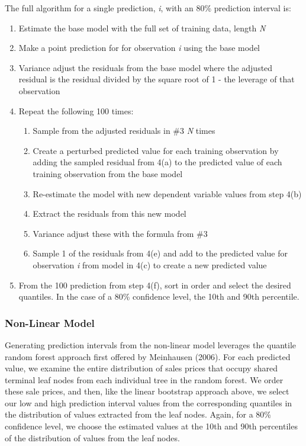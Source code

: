 \documentclass[colTwo]{anon}
\theoremstyle{definition}
\begin{document}
The full algorithm for a single prediction, \textit{i}, with an 80\% prediction interval is:
\begin{enumerate}
\item Estimate the base model with the full set of training data, length \textit{N}
\item Make a point prediction for for observation \textit{i} using the base model
\item Variance adjust the residuals from the base model where the adjusted residual is the residual divided by the square root of 1 - the leverage of that observation
\item Repeat the following 100 times:
\begin{enumerate}
\item Sample from the adjusted residuals in \#3 \textit{N} times
\item Create a perturbed predicted value for each training observation by adding the sampled residual from 4(a) to the predicted value of each training observation from the base model
\item Re-estimate the model with new dependent variable values from step 4(b)
\item Extract the residuals from this new model
\item Variance adjust these with the formula from \#3
\item Sample 1 of the residuals from 4(e) and add to the predicted value for observation \textit{i} from model in 4(c) to create a new predicted value
\end{enumerate}
\item From the 100 prediction from step 4(f), sort in order and select the desired quantiles.  In the case of a 80\% confidence level, the 10th and 90th percentile. 
\end{enumerate}

\subsubsection{Non-Linear Model}

Generating prediction intervals from the non-linear model leverages the quantile random forest approach first offered by Meinhausen (2006).  For each predicted value, we examine the entire distribution of sales prices that occupy shared terminal leaf nodes from each individual tree in the random forest.  We order these sale prices, and then, like the linear bootstrap approach above, we select our low and high prediction interval values from the corresponding quantiles in the distribution of values extracted from the leaf nodes. Again, for a 80\% confidence level, we choose the estimated values at the 10th and 90th percentiles of the distribution of values from the leaf nodes. 
\end{document}
